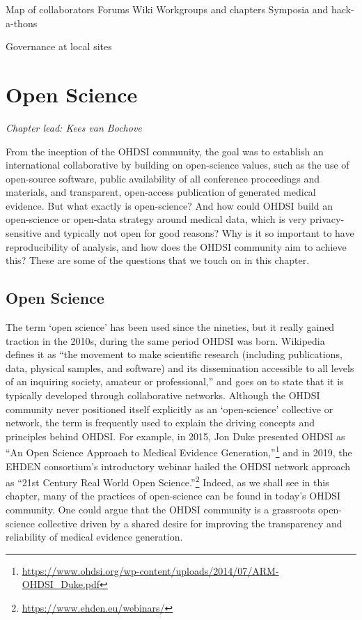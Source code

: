 \documentclass[11pt]{book}
\let\rmarkdownfootnote\footnote%
\def\footnote{\protect\rmarkdownfootnote}
\theoremstyle{definition}
\theoremstyle{definition}
\theoremstyle{definition}
\theoremstyle{remark}
\begin{document}
Map of collaborators
Forums
Wiki
Workgroups and chapters
Symposia and hack-a-thons

Governance at local sites

\hypertarget{OpenScience}{%
\chapter{Open Science}\label{OpenScience}}


\emph{Chapter lead: Kees van Bochove}

From the inception of the OHDSI community, the goal was to establish an international collaborative by building on open-science values, such as the use of open-source software, public availability of all conference proceedings and materials, and transparent, open-access publication of generated medical evidence. But what exactly is open-science? And how could OHDSI build an open-science or open-data strategy around medical data, which is very privacy-sensitive and typically not open for good reasons? Why is it so important to have reproducibility of analysis, and how does the OHDSI community aim to achieve this? These are some of the questions that we touch on in this chapter.

\hypertarget{open-science}{%
\section{Open Science}\label{open-science}}

The term `open science' has been used since the nineties, but it really gained traction in the 2010s, during the same period OHDSI was born. Wikipedia \citep{wiki:Open_science} defines it as ``the movement to make scientific research (including publications, data, physical samples, and software) and its dissemination accessible to all levels of an inquiring society, amateur or professional,'' and goes on to state that it is typically developed through collaborative networks. Although the OHDSI community never positioned itself explicitly as an `open-science' collective or network, the term is frequently used to explain the driving concepts and principles behind OHDSI. For example, in 2015, Jon Duke presented OHDSI as ``An Open Science Approach to Medical Evidence Generation,''\footnote{\url{https://www.ohdsi.org/wp-content/uploads/2014/07/ARM-OHDSI_Duke.pdf}} and in 2019, the EHDEN consortium's introductory webinar hailed the OHDSI network approach as ``21st Century Real World Open Science.''\footnote{\url{https://www.ehden.eu/webinars/}} Indeed, as we shall see in this chapter, many of the practices of open-science can be found in today's OHDSI community. One could argue that the OHDSI community is a grassroots open-science collective driven by a shared desire for improving the transparency and reliability of medical evidence generation.
\end{document}

